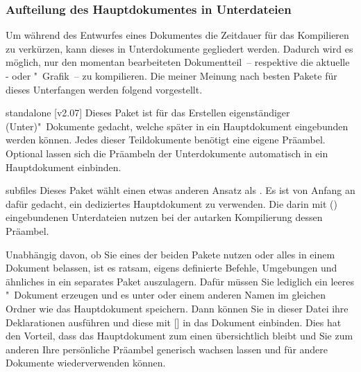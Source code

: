 \subsubsection{Aufteilung des Hauptdokumentes in Unterdateien}
Um während des Entwurfes eines Dokumentes die Zeitdauer für das Kompilieren zu 
verkürzen, kann dieses in Unterdokumente gegliedert werden. Dadurch wird es 
möglich, nur den momentan bearbeiteten Dokumentteil~-- respektive die aktuelle 
- oder "~Grafik~-- zu kompilieren. Die meiner 
Meinung nach besten Pakete für dieses Unterfangen werden folgend vorgestellt.
%
\begin{packages}
\item[standalone]
  [v2.07]%
  Dieses Paket ist für das Erstellen eigenständiger (Unter)"~Dokumente gedacht, 
  welche später in ein Hauptdokument eingebunden werden können. Jedes dieser 
  Teildokumente benötigt eine eigene Präambel. Optional lassen sich die 
  Präambeln der Unterdokumente automatisch in ein Hauptdokument einbinden.
\item[subfiles]
%
  Dieses Paket wählt einen etwas anderen Ansatz als . Es 
  ist von Anfang an dafür gedacht, ein dediziertes Hauptdokument zu verwenden. 
  Die darin mit () eingebundenen Unterdateien 
  nutzen bei der autarken Kompilierung dessen Präambel.
\end{packages}
%
Unabhängig davon, ob Sie eines der beiden Pakete nutzen oder alles in einem 
Dokument belassen, ist es ratsam, eigens definierte Befehle, Umgebungen und 
ähnliches in ein separates Paket auszulagern. Dafür müssen Sie lediglich ein 
leeres "~Dokument erzeugen und es unter  
oder einem anderen Namen im gleichen Ordner wie das Hauptdokument speichern. 
Dann können Sie in dieser Datei ihre Deklarationen ausführen und diese mit 
[] in das Dokument einbinden. Dies hat 
den Vorteil, dass das Hauptdokument zum einen übersichtlich bleibt und Sie zum 
anderen Ihre persönliche Präambel generisch wachsen lassen und für andere 
Dokumente wiederverwenden können.



